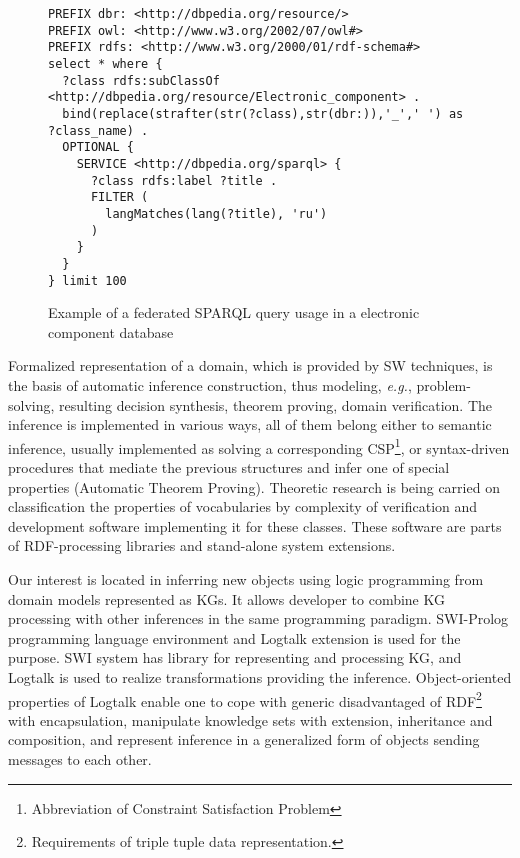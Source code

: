\documentclass[
]{ceurart}
\begin{document}
\begin{figure}[bth]
  \centering
\begin{verbatim}
PREFIX dbr: <http://dbpedia.org/resource/>
PREFIX owl: <http://www.w3.org/2002/07/owl#>
PREFIX rdfs: <http://www.w3.org/2000/01/rdf-schema#>
select * where {
  ?class rdfs:subClassOf <http://dbpedia.org/resource/Electronic_component> .
  bind(replace(strafter(str(?class),str(dbr:)),'_',' ') as ?class_name) .
  OPTIONAL {
    SERVICE <http://dbpedia.org/sparql> {
      ?class rdfs:label ?title .
      FILTER (
        langMatches(lang(?title), 'ru')
      )
    }
  }
} limit 100
\end{verbatim}
  \caption{Example of a federated SPARQL query usage in a electronic component database}
  \label{fig:sparql-ex1}
\end{figure}

Formalized representation of a domain, which is provided by SW techniques, is the basis of automatic  inference construction, thus modeling, \emph{e.g.}, problem-solving, resulting decision synthesis, theorem proving, domain verification.  The inference is implemented in various ways, all of them belong either to semantic inference, usually implemented as solving a corresponding CSP\footnote{Abbreviation of Constraint Satisfaction Problem}, or syntax-driven procedures that mediate the previous structures and infer one of special properties (Automatic Theorem Proving).  Theoretic research is being carried on classification the properties of vocabularies by complexity of verification and development software implementing it for these classes.  These software are parts of RDF-processing libraries and stand-alone system extensions.

Our interest is located in inferring new objects using logic programming from domain models represented as KGs.  It allows developer to combine KG processing with other inferences in the same programming paradigm.  SWI-Prolog programming language environment and Logtalk extension is used for the purpose.  SWI system has library for representing and processing KG, and Logtalk is used to realize transformations providing the inference.  Object-oriented properties of Logtalk enable one to cope with generic disadvantaged of RDF\footnote{Requirements of triple tuple data representation.} with encapsulation, manipulate knowledge sets with extension, inheritance and composition, and represent inference in a generalized form of objects sending messages to each other.


\end{document}
